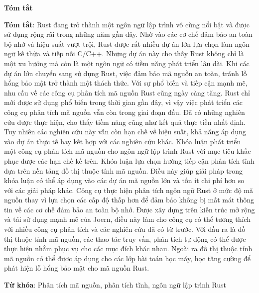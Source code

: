 \begin{center}
\textbf{\large{Tóm tắt}}
\end{center}


\begin{small}
\textbf{Tóm tắt}: Rust đang trở thành một ngôn ngữ lập trình vô cùng nổi bật và được sử dụng rộng rãi trong những năm gần đây.
Nhờ vào các cơ chế đảm bảo an toàn bộ nhớ và hiệu suất vượt trội, Rust được rất nhiều dự án lớn lựa chọn làm ngôn ngữ kế thừa và tiếp nối C/C++.
Những dự án này cho thấy Rust không chỉ là một xu hướng mà còn là một ngôn ngữ có tiềm năng phát triển lâu dài.
Khi các dự án lớn chuyển sang sử dụng Rust, việc đảm bảo mã nguồn an toàn, tránh lỗ hổng bảo mật trở thành một thách thức.
Với sự phổ biến và tiếp cận mạnh mẽ, nhu cầu về các công cụ phân tích mã nguồn Rust cũng ngày càng tăng.
Rust chỉ mới được sử dụng phổ biến trong thời gian gần đây, vì vậy việc phát triển các công cụ phân tích mã nguồn vẫn còn trong giai đoạn đầu.
Đã có những nghiên cứu được thực hiện, cho thấy tiềm năng cũng như kết quả thực tiễn nhất định.
Tuy nhiên các nghiên cứu này vẫn còn hạn chế về hiệu suất, khả năng áp dụng vào dự án thực tế hay kết hợp với các nghiên cứu khác.
Khóa luận phát triển một công cụ phân tích mã nguồn cho ngôn ngữ lập trình Rust với mục tiêu khắc phục được các hạn chế kế trên.
Khóa luận lựa chọn hướng tiếp cận phân tích tĩnh dựa trên nền tảng đồ thị thuộc tính mã nguồn.
Điều này giúp giải pháp trong khóa luận có thể áp dụng vào các dự án mã nguồn lớn và tốn ít chi phí hơn so với các giải pháp khác.
Công cụ thực hiện phân tích ngôn ngữ Rust ở mức độ mã nguồn thay vì lựa chọn các cấp độ thấp hơn để đảm bảo không bị mất mát thông tin về các cơ chế đảm bảo an toàn bộ nhớ.
Được xây dựng trên kiến trúc mở rộng và tái sử dụng mạnh mẽ của Joern, điều này làm cho công cụ có thể tương thích với nhiều công cụ phân tích và các nghiên cứu đã có từ trước.
Với đầu ra là đồ thị thuộc tính mã nguồn, các thao tác truy vấn, phân tích tự động có thể được thực hiện nhằm phục vụ cho các mục đích khác nhau.
Ngoài ra đồ thị thuộc tính mã nguồn có thể được áp dụng cho các lớp bài toán học máy, học tăng cường để phát hiện lỗ hổng bảo mật cho mã nguồn Rust.

\vspace*{1cm}
\textbf{Từ khóa}: Phân tích mã nguồn, phân tích tĩnh, ngôn ngữ lập trình Rust

\end{small}
